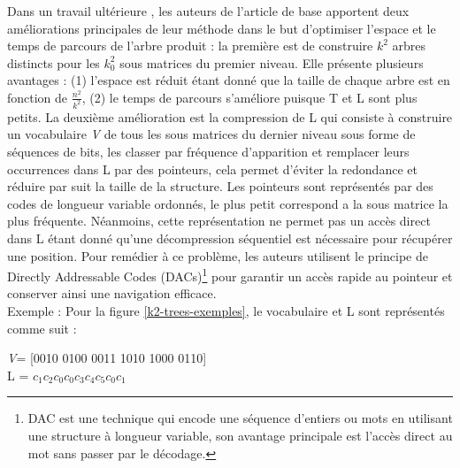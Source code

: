 Dans un travail ultérieure \citep{brisaboa2014compact}, les auteurs de l'article de base apportent deux améliorations principales de leur méthode dans le but d'optimiser l'espace et le temps de parcours de l'arbre produit : la première est de construire $k^2$ arbres distincts pour les $k_{0}^{2}$ sous matrices du premier niveau. Elle présente plusieurs avantages : (1) l'espace est réduit étant donné que la taille de chaque arbre est en fonction de $\frac{n^2}{k^2}$, (2) le temps de parcours s'améliore puisque T et L sont plus petits. La deuxième amélioration est la compression de L qui consiste à construire un vocabulaire \textit{V} de tous les sous matrices du dernier niveau sous forme de séquences de bits, les classer par fréquence d'apparition et remplacer leurs occurrences dans L par des pointeurs, cela permet d'éviter la redondance et réduire par suit la taille de la structure. Les pointeurs sont représentés par des codes de longueur variable ordonnés, le plus petit correspond a la sous matrice la plus fréquente. Néanmoins, cette représentation ne permet pas un accès direct dans L étant donné qu'une décompression séquentiel est nécessaire pour récupérer une position. Pour remédier à ce problème, les auteurs utilisent le principe de Directly Addressable Codes (DACs)\footnote{DAC est une technique qui encode une séquence d'entiers ou mots en utilisant une structure à longueur variable, son avantage principale est l'accès direct au mot sans passer par le décodage.} \citep{brisaboa2013dacs} pour garantir un accès rapide au pointeur et conserver ainsi une navigation efficace.\\
Exemple : Pour la figure \ref{k2-trees-exemples}, le vocabulaire et L sont représentés comme suit :\\
\begin{center}
\textit{V}= [0010 0100 0011 1010 1000 0110]\\
L = $c_{1}c_{2}c_{0}c_{0}c_{3}c_{4}c_{5}c_{0}c_{1}$ \\
\end{center}

